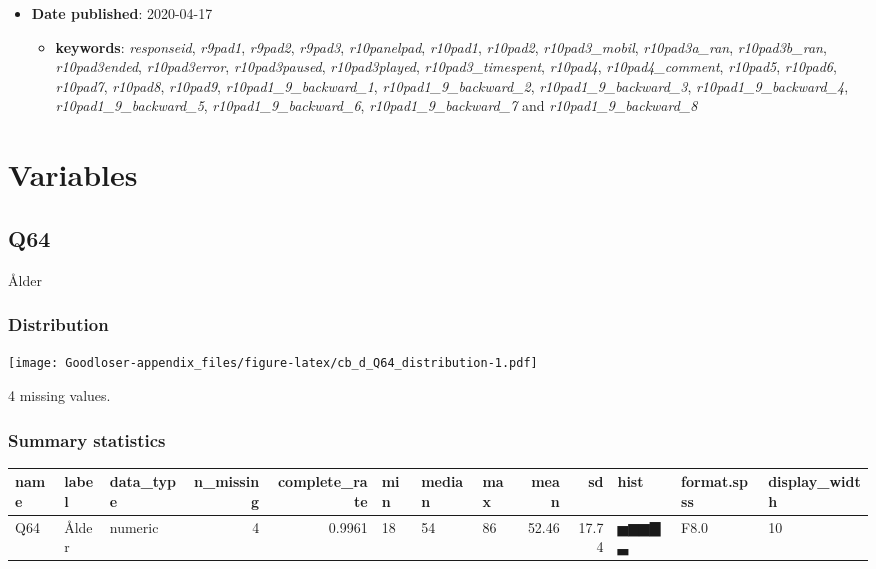 \documentclass[
]{book}
\providecommand{\tightlist}{%
  \setlength{\itemsep}{0pt}\setlength{\parskip}{0pt}}
\begin{document}
\begin{itemize}
\item
  \textbf{Date published}: 2020-04-17

  \begin{itemize}
  \tightlist
  \item
    \textbf{keywords}: \emph{responseid}, \emph{r9pad1}, \emph{r9pad2}, \emph{r9pad3}, \emph{r10panelpad}, \emph{r10pad1}, \emph{r10pad2}, \emph{r10pad3\_mobil}, \emph{r10pad3a\_ran}, \emph{r10pad3b\_ran}, \emph{r10pad3ended}, \emph{r10pad3error}, \emph{r10pad3paused}, \emph{r10pad3played}, \emph{r10pad3\_timespent}, \emph{r10pad4}, \emph{r10pad4\_comment}, \emph{r10pad5}, \emph{r10pad6}, \emph{r10pad7}, \emph{r10pad8}, \emph{r10pad9}, \emph{r10pad1\_9\_backward\_1}, \emph{r10pad1\_9\_backward\_2}, \emph{r10pad1\_9\_backward\_3}, \emph{r10pad1\_9\_backward\_4}, \emph{r10pad1\_9\_backward\_5}, \emph{r10pad1\_9\_backward\_6}, \emph{r10pad1\_9\_backward\_7} and \emph{r10pad1\_9\_backward\_8}
  \end{itemize}
\end{itemize}

\hypertarget{variables-1}{%
\section{Variables}\label{variables-1}}

\hypertarget{Q64}{%
\subsection{Q64}\label{Q64}}

Ålder

\hypertarget{Q64_distribution}{%
\subsubsection{Distribution}\label{Q64_distribution}}

\texttt{[image: Goodloser-appendix\_files/figure-latex/cb\_d\_Q64\_distribution-1.pdf]}

4 missing values.

\hypertarget{Q64_summary}{%
\subsubsection{Summary statistics}\label{Q64_summary}}

\begin{tabular}{l|l|l|r|r|l|l|l|r|r|l|l|l}
\hline
name & label & data_type & n_missing & complete_rate & min & median & max & mean & sd & hist & format.spss & display_width\\
\hline
Q64 & Ålder & numeric & 4 & 0.9961 & 18 & 54 & 86 & 52.46 & 17.74 & ▅▆▆▇▃ & F8.0 & 10\\
\hline
\end{tabular}
\end{document}
